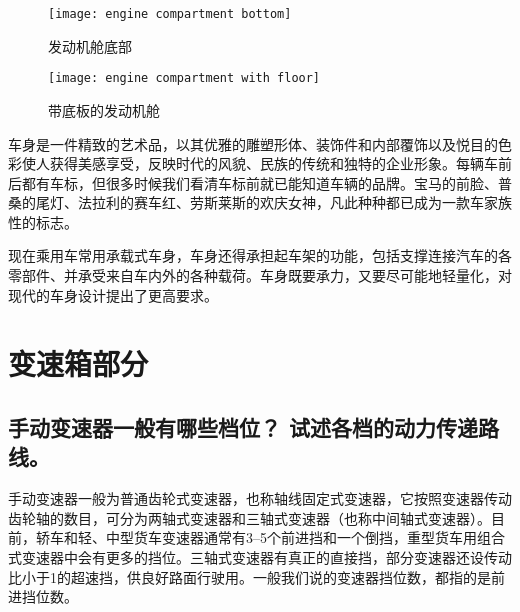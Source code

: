 \documentclass[UTF8]{ctexart}
\numberwithin{figure}{section}
\numberwithin{table}{section}
\begin{document}
\begin{figure}[htbp]
	\centering
	\begin{minipage}[b]{0.4\textwidth}
		\centering
		\texttt{[image: engine compartment bottom]}
		\caption{发动机舱底部}
		\label{engine compartment bottom}
	\end{minipage}
	\begin{minipage}[b]{0.5\textwidth}
		\centering
		\texttt{[image: engine compartment with floor]}
		\caption{带底板的发动机舱}
		\label{engine compartment with floor}
	\end{minipage}
\end{figure}

车身是一件精致的艺术品，以其优雅的雕塑形体、装饰件和内部覆饰以及悦目的色彩使人获得美感享受，反映时代的风貌、民族的传统和独特的企业形象。每辆车前后都有车标，但很多时候我们看清车标前就已能知道车辆的品牌。宝马的前脸、普桑的尾灯、法拉利的赛车红、劳斯莱斯的欢庆女神，凡此种种都已成为一款车家族性的标志。

现在乘用车常用承载式车身，车身还得承担起车架的功能，包括支撑连接汽车的各零部件、并承受来自车内外的各种载荷。车身既要承力，又要尽可能地轻量化，对现代的车身设计提出了更高要求。

\clearpage

\section{变速箱部分}
\subsection{手动变速器一般有哪些档位？ 试述各档的动力传递路线。}

\label{subsection:2.1}

手动变速器一般为普通齿轮式变速器，也称轴线固定式变速器，它按照变速器传动齿轮轴的数目，可分为两轴式变速器和三轴式变速器（也称中间轴式变速器）。目前，轿车和轻、中型货车变速器通常有\numrange[range-phrase = $\,\sim\,$]{3}{5}个前进挡和一个倒挡，重型货车用组合式变速器中会有更多的挡位。三轴式变速器有真正的直接挡，部分变速器还设传动比小于1的超速挡，供良好路面行驶用。一般我们说的变速器挡位数，都指的是前进挡位数。
\end{document}
